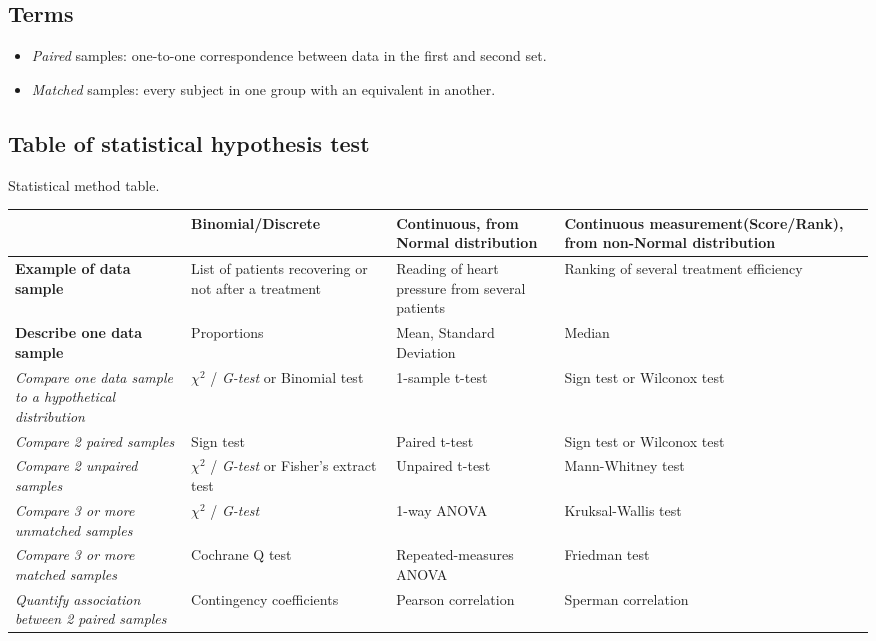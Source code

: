 \subsection{Terms}
\begin{itemize}
    \item \emph{Paired} samples: one-to-one correspondence between data in the first and
        second set.
    \item \emph{Matched} samples: every subject in one group with an equivalent in 
        another.
\end{itemize}


\subsection{Table of statistical hypothesis test}
\label{statistical_method_table}{Statistical method table.}\\ 
\begin{tabular}{|*{4}{b{4cm}|}}
\hline
& \textbf{Binomial/Discrete} & \textbf{Continuous, from Normal distribution} & 
\textbf{Continuous measurement\newline (Score/Rank), from non-Normal distribution} \\
\hline
    \textbf{Example of data sample} & List of patients recovering or not after a 
    treatment & Reading of heart pressure from several patients & Ranking of several
    treatment efficiency\\
\hline
    \textbf{Describe one data sample} & Proportions & Mean, Standard Deviation & Median \\
    \hline
    \emph{Compare one data sample to a hypothetical distribution} & $\chi^{2}$ / \emph{G-test} or \label{binomial_test}{Binomial test} & 1-sample t-test & Sign test or Wilconox test \\
    \hline
    \emph{Compare 2 paired samples} & Sign test & Paired t-test & Sign test or Wilconox test \\
    \hline
    \emph{Compare 2 unpaired samples} & $\chi^{2}$ / \emph{G-test} or Fisher's extract test & Unpaired t-test & Mann-Whitney test \\
    \hline
    \emph{Compare 3 or more unmatched samples} & $\chi^{2}$ / \emph{G-test} & 1-way ANOVA & Kruksal-Wallis test \\
    \hline
    \emph{Compare 3 or more matched samples} & Cochrane Q test & Repeated-measures ANOVA & Friedman test\\
    \hline
    \emph{Quantify association between 2 paired samples} & Contingency coefficients & Pearson correlation & Sperman correlation \\
    \hline
\end{tabular}
